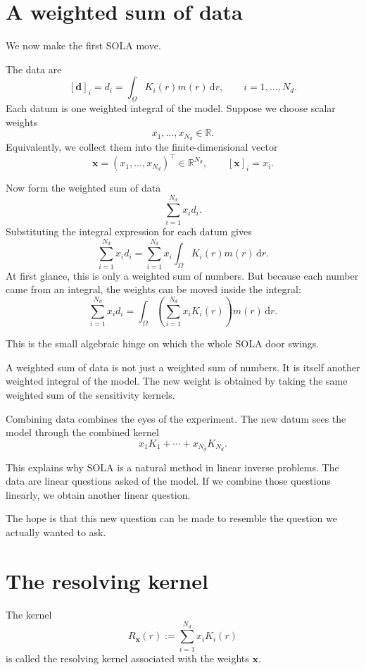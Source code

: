 \documentclass[11pt,openany]{book}
\theoremstyle{definition}
\theoremstyle{remark}
\newcommand{\dd}{\,\mathrm d}
\begin{document}
\section{A weighted sum of data}

We now make the first SOLA move.

The data are
\[
  [\mathbf d]_i=d_i
  =
  \int_\Omega K_i(r)m(r)\dd r,
  \qquad i=1,\dots,N_d.
\]
Each datum is one weighted integral of the model. Suppose we choose scalar weights
\[
  x_1,\dots,x_{N_d}\in\mathbb R.
\]
Equivalently, we collect them into the finite-dimensional vector
\[
  \mathbf x
  =
  (x_1,\dots,x_{N_d})^\top
  \in\mathbb R^{N_d},
  \qquad
  [\mathbf x]_i=x_i.
\]

Now form the weighted sum of data
\[
  \sum_{i=1}^{N_d}x_i d_i.
\]
Substituting the integral expression for each datum gives
\[
  \sum_{i=1}^{N_d}x_i d_i
  =
  \sum_{i=1}^{N_d}
  x_i
  \int_\Omega K_i(r)m(r)\dd r.
\]
At first glance, this is only a weighted sum of numbers. But because each number came from
an integral, the weights can be moved inside the integral:
\[
  \sum_{i=1}^{N_d}x_i d_i
  =
  \int_\Omega
  \left(
    \sum_{i=1}^{N_d}x_iK_i(r)
  \right)
  m(r)\dd r.
\]

This is the small algebraic hinge on which the whole SOLA door swings.

A weighted sum of data is not just a weighted sum of numbers. It is itself another weighted
integral of the model. The new weight is obtained by taking the same weighted sum of the
sensitivity kernels.

\begin{intuitionbox}
Combining data combines the eyes of the experiment. The new datum sees the model through
the combined kernel
\[
  x_1K_1+\cdots+x_{N_d}K_{N_d}.
\]
\end{intuitionbox}

This explains why SOLA is a natural method in linear inverse problems. The data are linear
questions asked of the model. If we combine those questions linearly, we obtain another linear
question.

The hope is that this new question can be made to resemble the question we actually wanted
to ask.

\section{The resolving kernel}

The kernel
\[
  R_{\mathbf x}(r)
  :=
  \sum_{i=1}^{N_d}x_iK_i(r)
\]
is called the resolving kernel associated with the weights \(\mathbf x\).
\end{document}
